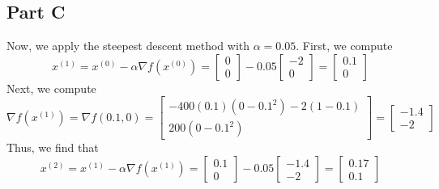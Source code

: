 \documentclass[12pt]{article}
\begin{document}
\subsection*{Part C}
Now, we apply the steepest descent method with $\alpha = 0.05$. First, we compute
\[
 x^{(1)} = x^{(0)} - \alpha \nabla f(x^{(0)}) = 
 \begin{bmatrix}
 0 \\
 0
 \end{bmatrix} - 0.05 \begin{bmatrix}
 -2 \\ 0
 \end{bmatrix} = 
\begin{bmatrix}
0.1 \\
0
\end{bmatrix}
\]
 Next, we compute
\[
\nabla f(x^{(1)}) =  \nabla f(0.1,0) = 
\begin{bmatrix}
-400(0.1)(0-0.1^2) - 2(1-0.1)\\
200(0 - 0.1^2)
\end{bmatrix}
=
\begin{bmatrix}
-1.4\\
-2
\end{bmatrix}
\] Thus, we find that
\[
x^{(2)} = x^{(1)} - \alpha \nabla f(x^{(1)}) = \begin{bmatrix} 0.1\\ 0
\end{bmatrix} - 0.05 \begin{bmatrix} -1.4 \\ - 2
\end{bmatrix} = \begin{bmatrix} 0.17\\ 0.1
\end{bmatrix}
\]
\newpage
\end{document}

